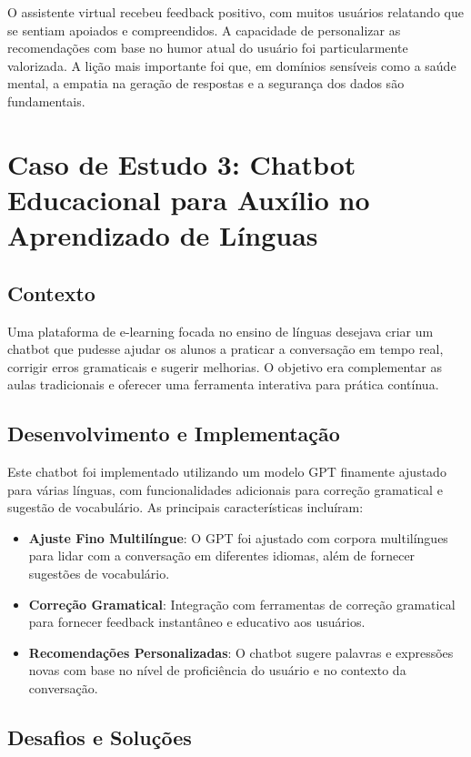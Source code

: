 \documentclass[14pt,a4paper,oneside]{book}
\begin{document}
O assistente virtual recebeu feedback positivo, com muitos usuários relatando que se sentiam apoiados e compreendidos. A capacidade de personalizar as recomendações com base no humor atual do usuário foi particularmente valorizada. A lição mais importante foi que, em domínios sensíveis como a saúde mental, a empatia na geração de respostas e a segurança dos dados são fundamentais.

\section{Caso de Estudo 3: Chatbot Educacional para Auxílio no Aprendizado de Línguas}

\subsection{Contexto}

Uma plataforma de e-learning focada no ensino de línguas desejava criar um chatbot que pudesse ajudar os alunos a praticar a conversação em tempo real, corrigir erros gramaticais e sugerir melhorias. O objetivo era complementar as aulas tradicionais e oferecer uma ferramenta interativa para prática contínua.

\subsection{Desenvolvimento e Implementação}

Este chatbot foi implementado utilizando um modelo GPT finamente ajustado para várias línguas, com funcionalidades adicionais para correção gramatical e sugestão de vocabulário. As principais características incluíram:

\begin{itemize}
	\item \textbf{Ajuste Fino Multilíngue}: O GPT foi ajustado com corpora multilíngues para lidar com a conversação em diferentes idiomas, além de fornecer sugestões de vocabulário.
	\item \textbf{Correção Gramatical}: Integração com ferramentas de correção gramatical para fornecer feedback instantâneo e educativo aos usuários.
	\item \textbf{Recomendações Personalizadas}: O chatbot sugere palavras e expressões novas com base no nível de proficiência do usuário e no contexto da conversação.
\end{itemize}

\subsection{Desafios e Soluções}
\end{document}
